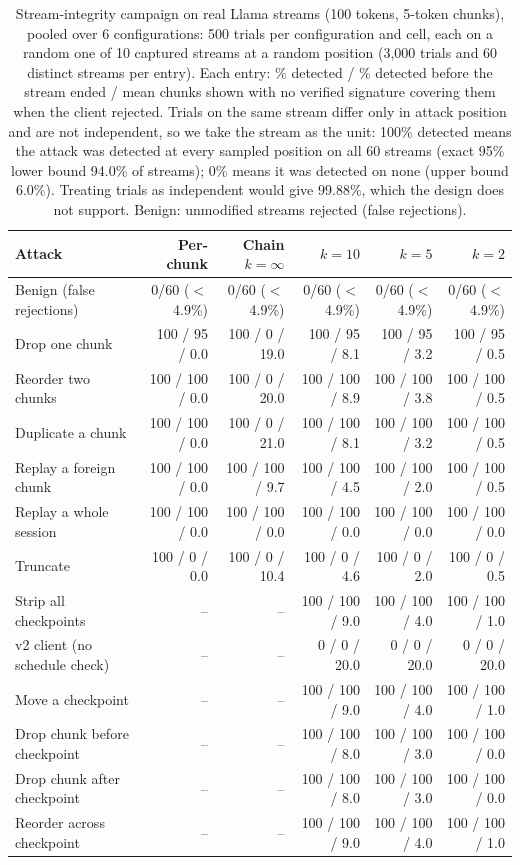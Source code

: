 \begin{table}[t]
\centering
\caption{Stream-integrity campaign on real Llama streams (100 tokens, 5-token chunks), pooled over 6 configurations: 500 trials per configuration and cell, each on a random one of 10 captured streams at a random position (3,000 trials and 60 distinct streams per entry). Each entry: \% detected / \% detected before the stream ended / mean chunks shown with no verified signature covering them when the client rejected. Trials on the same stream differ only in attack position and are not independent, so we take the stream as the unit: 100\% detected means the attack was detected at every sampled position on all 60 streams (exact 95\% lower bound 94.0\% of streams); 0\% means it was detected on none (upper bound 6.0\%). Treating trials as independent would give 99.88\%, which the design does not support. Benign: unmodified streams rejected (false rejections).}
\label{tab:campaign}
\setlength{\tabcolsep}{2.5pt}
\scriptsize
\begin{tabular}{@{}lrrrrr@{}}
\toprule
Attack & Per-chunk & Chain $k{=}\infty$ & $k{=}10$ & $k{=}5$ & $k{=}2$ \\
\midrule
Benign (false rejections) & 0/60 ($<$4.9\%) & 0/60 ($<$4.9\%) & 0/60 ($<$4.9\%) & 0/60 ($<$4.9\%) & 0/60 ($<$4.9\%) \\
\midrule
Drop one chunk & 100 / 95 / 0.0 & 100 / 0 / 19.0 & 100 / 95 / 8.1 & 100 / 95 / 3.2 & 100 / 95 / 0.5 \\
Reorder two chunks & 100 / 100 / 0.0 & 100 / 0 / 20.0 & 100 / 100 / 8.9 & 100 / 100 / 3.8 & 100 / 100 / 0.5 \\
Duplicate a chunk & 100 / 100 / 0.0 & 100 / 0 / 21.0 & 100 / 100 / 8.1 & 100 / 100 / 3.2 & 100 / 100 / 0.5 \\
Replay a foreign chunk & 100 / 100 / 0.0 & 100 / 100 / 9.7 & 100 / 100 / 4.5 & 100 / 100 / 2.0 & 100 / 100 / 0.5 \\
Replay a whole session & 100 / 100 / 0.0 & 100 / 100 / 0.0 & 100 / 100 / 0.0 & 100 / 100 / 0.0 & 100 / 100 / 0.0 \\
Truncate & 100 / 0 / 0.0 & 100 / 0 / 10.4 & 100 / 0 / 4.6 & 100 / 0 / 2.0 & 100 / 0 / 0.5 \\
Strip all checkpoints & -- & -- & 100 / 100 / 9.0 & 100 / 100 / 4.0 & 100 / 100 / 1.0 \\
\quad v2 client (no schedule check) & -- & -- & 0 / 0 / 20.0 & 0 / 0 / 20.0 & 0 / 0 / 20.0 \\
Move a checkpoint & -- & -- & 100 / 100 / 9.0 & 100 / 100 / 4.0 & 100 / 100 / 1.0 \\
Drop chunk before checkpoint & -- & -- & 100 / 100 / 8.0 & 100 / 100 / 3.0 & 100 / 100 / 0.0 \\
Drop chunk after checkpoint & -- & -- & 100 / 100 / 8.0 & 100 / 100 / 3.0 & 100 / 100 / 0.0 \\
Reorder across checkpoint & -- & -- & 100 / 100 / 9.0 & 100 / 100 / 4.0 & 100 / 100 / 1.0 \\
\bottomrule
\end{tabular}
\end{table}
